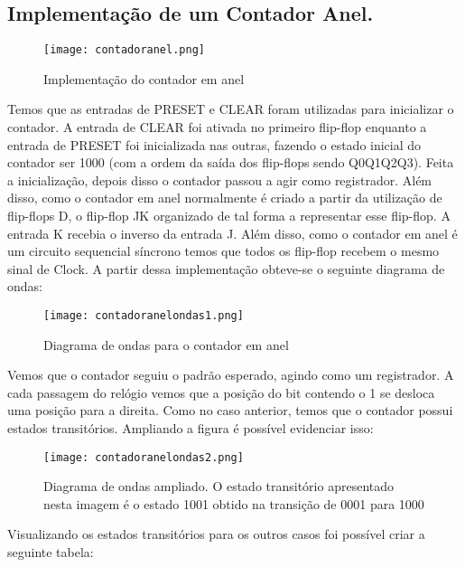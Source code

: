 \documentclass[12pt]{article}
\begin{document}
	
	
	\subsection{Implementação de um Contador Anel.}
	
	\begin{figure}[H]
		\centering
		\texttt{[image: contadoranel.png]}
		\caption{ Implementação do contador em anel}
		\label{fig:contadoranel}
	\end{figure}
	
	
	
	Temos que as entradas de PRESET e CLEAR foram utilizadas para inicializar o contador. A entrada de CLEAR foi ativada no primeiro flip-flop enquanto a entrada de PRESET foi inicializada nas outras, fazendo o estado inicial do contador ser 1000 (com a ordem da saída dos flip-flops sendo Q0Q1Q2Q3). Feita a inicialização, depois disso o contador passou a agir como registrador. Além disso, como o contador em anel normalmente é criado a partir da utilização de flip-flops D, o flip-flop JK organizado de tal forma a representar esse flip-flop. A entrada K recebia o inverso da entrada J. Além disso, como o contador em anel é um circuito sequencial síncrono temos que todos os flip-flop recebem o mesmo sinal de Clock. A partir dessa implementação obteve-se o seguinte diagrama de ondas:
	
	\begin{figure}[H]
		\centering
		\texttt{[image: contadoranelondas1.png]}
		\caption{ Diagrama de ondas para o contador em anel}
		\label{fig:contadoranelondas1}
	\end{figure}
	
	Vemos que o contador seguiu o padrão esperado, agindo como um registrador. A cada passagem do relógio vemos que a posição do bit contendo o 1 se desloca uma posição para a direita. Como no caso anterior, temos que o contador possui estados transitórios. Ampliando a figura é possível evidenciar isso:
	
	\begin{figure}[H]
		\centering
		\texttt{[image: contadoranelondas2.png]}
		\caption{ Diagrama de ondas ampliado. O estado transitório apresentado nesta imagem é o estado 1001 obtido na transição de 0001 para 1000}
		\label{fig:contadoranelondas2}
	\end{figure}
	
	Visualizando os estados transitórios para os outros casos foi possível criar a seguinte tabela:
	
\end{document}
